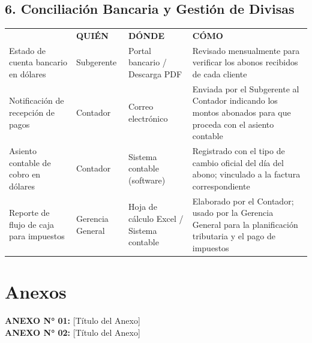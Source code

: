 \documentclass[11pt,letterpaper]{report}
\begin{document}
\section*{6. Conciliación Bancaria y Gestión de Divisas}
\begin{tabularx}{\textwidth}{>{\raggedright\arraybackslash}X >{\raggedright\arraybackslash}p{} >{\raggedright\arraybackslash}p{} >{\raggedright\arraybackslash}X}
\toprule
\multirow{2}{*}{\textbf{DOCUMENTO (QUÉ)}} & \multicolumn{3}{c}{\textbf{CUSTODIA}} \\
\cmidrule{2-4}
& \textbf{QUIÉN} & \textbf{DÓNDE} & \textbf{CÓMO} \\
\midrule
Estado de cuenta bancario en dólares & Subgerente & Portal bancario / Descarga PDF & Revisado mensualmente para verificar los abonos recibidos de cada cliente \\
\midrule
Notificación de recepción de pagos & Contador & Correo electrónico & Enviada por el Subgerente al Contador indicando los montos abonados para que proceda con el asiento contable \\
\midrule
Asiento contable de cobro en dólares & Contador & Sistema contable (software) & Registrado con el tipo de cambio oficial del día del abono; vinculado a la factura correspondiente \\
\midrule
Reporte de flujo de caja para impuestos & Gerencia General & Hoja de cálculo Excel / Sistema contable & Elaborado por el Contador; usado por la Gerencia General para la planificación tributaria y el pago de impuestos \\
\bottomrule
\end{tabularx}

\vspace{2em}

\chapter{Anexos}
\textbf{ANEXO N° 01:} [Título del Anexo] \\
\textbf{ANEXO N° 02:} [Título del Anexo]
\end{document}
